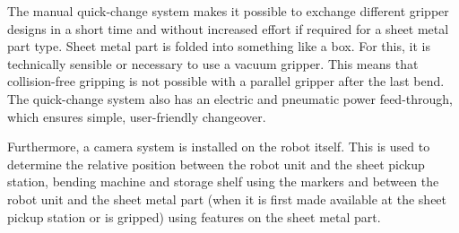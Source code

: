 The manual quick-change system makes it possible to exchange different gripper
designs in a short time and without increased effort if required for a sheet metal part type. Sheet metal
part is folded into something like a box. For this, it is technically sensible or necessary to use a
vacuum gripper.
This means that collision-free gripping is not possible with a parallel gripper after the last bend. The
quick-change system also has an electric and pneumatic power feed-through, which ensures simple,
user-friendly changeover.



Furthermore, a camera system is installed on the robot itself. This is used to determine the relative
position between the robot unit and the sheet pickup station, bending machine and storage shelf using the markers
and between the robot unit and the sheet metal part (when it is first made available at the
sheet pickup station or is gripped) using features on the sheet metal part.